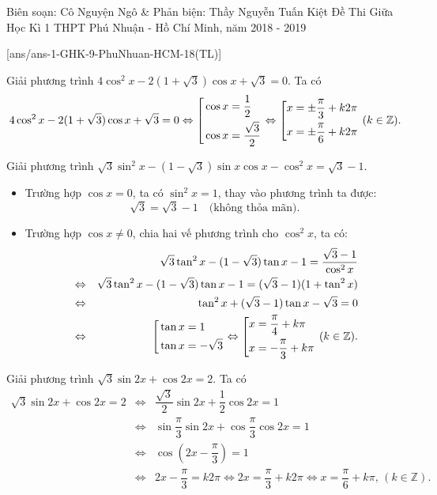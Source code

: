 
\begin{name}
{Biên soạn: Cô Nguyện Ngô \& Phản biện: Thầy Nguyễn Tuấn Kiệt}
{Đề Thi Giữa Học Kì 1 THPT Phú Nhuận - Hồ Chí Minh, năm 2018 - 2019}
\end{name}

\setcounter{ex}{0}\setcounter{bt}{0}
[ans/ans-1-GHK-9-PhuNhuan-HCM-18(TL)]

\begin{bt}%
Giải phương trình $4\cos^2x-2(1+\sqrt{3})\cos x+\sqrt {3}=0$.
\loigiai
{Ta có
\[4\cos^2 x-2(1+\sqrt{3})\cos x+\sqrt {3}=0
\Leftrightarrow\left[\begin{aligned}&\cos x=\dfrac {1}{2}\\&\cos x=\dfrac{\sqrt{3}}{2}\end{aligned}\right.
\Leftrightarrow \left[\begin{aligned}&x=\pm\dfrac{\pi}{3}+k2\pi\\&x=\pm\dfrac{\pi}{6}+k2\pi\end{aligned}\right.\, (k\in\mathbb{Z}).\]
}
\end{bt}

\begin{bt}%
Giải phương trình $\sqrt{3}\sin^2x-(1-\sqrt{3})\sin x\cos x-\cos^2 x=\sqrt{3}-1$.
\loigiai
{\begin{itemize}
\item Trường hợp $\cos x=0$, ta có $\sin^2x=1$, thay vào phương trình ta được:
\[\sqrt{3}=\sqrt{3}-1\quad\text{(không thỏa mãn)}.\]
\item Trường hợp $\cos x\ne 0$, chia hai vế phương trình cho $\cos^2x$, ta có:
 \begin{eqnarray*}&&\sqrt{3}\tan^2 x-(1-\sqrt{3})\tan x-1=\dfrac{\sqrt{3}-1}{\cos^2x}\\
 &\Leftrightarrow&\sqrt{3}\tan^2 x-(1-\sqrt{3})\tan x-1=(\sqrt{3}-1)(1+\tan^2x)\\
 &\Leftrightarrow&\tan^2x+(\sqrt{3}-1)\tan x-\sqrt{3}=0\\
 &\Leftrightarrow&\left[\begin{aligned}&\tan x=1\\&\tan x=-\sqrt{3}\end{aligned}\right.\Leftrightarrow\left[\begin{aligned}&x=\dfrac{\pi}{4}+k\pi\\&x=-\dfrac{\pi}{3}+k\pi\end{aligned}\right.\, (k\in\mathbb{Z}).
 \end{eqnarray*}
\end{itemize}
}
\end{bt}

\begin{bt}%
Giải phương trình $\sqrt{3}\sin 2x +\cos 2x =2$.
\loigiai
{Ta có
\begin{eqnarray*}\sqrt{3}\sin 2x +\cos 2x =2&\Leftrightarrow&\dfrac{\sqrt{3}}{2}\sin2x+\dfrac{1}{2}\cos2x=1\\
&\Leftrightarrow&\sin\dfrac{\pi}{3}\sin2x+\cos\dfrac{\pi}{3}\cos2x=1\\
&\Leftrightarrow&\cos\left(2x-\dfrac {\pi}{3}\right)=1\\
&\Leftrightarrow& 2x-\dfrac{\pi}{3}=k2\pi \Leftrightarrow 2x=\dfrac{\pi}{3}+k 2\pi \Leftrightarrow x=\dfrac{\pi}{6}+k\pi,\, (k\in\mathbb{Z}).
\end{eqnarray*}
}
\end{bt}

